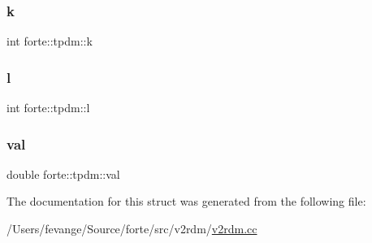 \subsubsection{\texorpdfstring{k}{k}}
{\footnotesize\ttfamily int forte\+::tpdm\+::k}

\mbox{\label{structforte_1_1tpdm_a1c2e8857e6c5c6504afea51539523dc7}} 
\subsubsection{\texorpdfstring{l}{l}}
{\footnotesize\ttfamily int forte\+::tpdm\+::l}

\mbox{\label{structforte_1_1tpdm_a628b4481e3ab6fedf1dc5e7e3dbacbcf}} 
\subsubsection{\texorpdfstring{val}{val}}
{\footnotesize\ttfamily double forte\+::tpdm\+::val}



The documentation for this struct was generated from the following file\+:\begin{DoxyCompactItemize}
\item 
/\+Users/fevange/\+Source/forte/src/v2rdm/\mbox{\hyperlink{v2rdm_8cc}{v2rdm.\+cc}}\end{DoxyCompactItemize}
